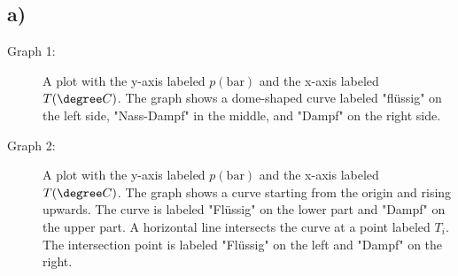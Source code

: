 

\subsection*{a)}

\begin{description}
    \item[Graph 1:] A plot with the y-axis labeled \( p(\text{bar}) \) and the x-axis labeled \( T(\degree C) \). The graph shows a dome-shaped curve labeled "flüssig" on the left side, "Nass-Dampf" in the middle, and "Dampf" on the right side.
    \item[Graph 2:] A plot with the y-axis labeled \( p(\text{bar}) \) and the x-axis labeled \( T(\degree C) \). The graph shows a curve starting from the origin and rising upwards. The curve is labeled "Flüssig" on the lower part and "Dampf" on the upper part. A horizontal line intersects the curve at a point labeled \( T_i \). The intersection point is labeled "Flüssig" on the left and "Dampf" on the right.
\end{description}